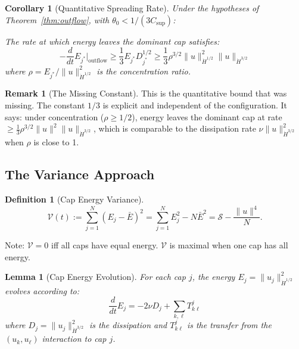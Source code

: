\documentclass[11pt]{article}
\newtheorem{lemma}[theorem]{Lemma}
\newtheorem{corollary}[theorem]{Corollary}
\theoremstyle{definition}
\newtheorem{definition}[theorem]{Definition}
\newtheorem{remark}[theorem]{Remark}
\begin{document}
\begin{corollary}[Quantitative Spreading Rate]\label{cor:spreading-rate}
Under the hypotheses of Theorem~\ref{thm:outflow}, with $\theta_0 < 1/(3C_{\text{sup}})$:

The rate at which energy leaves the dominant cap satisfies:
\begin{equation}\label{eq:spreading-rate}
\boxed{-\frac{d}{dt}E_{j^*}\Big|_{\text{outflow}} \geq \frac{1}{3} E_{j^*} D_{j^*}^{1/2} \geq \frac{1}{3} \rho^{3/2} \|u\|_{\dot{H}^{1/2}}^2 \|u\|_{\dot{H}^{3/2}}}
\end{equation}
where $\rho = E_{j^*}/\|u\|_{\dot{H}^{1/2}}^2$ is the concentration ratio.
\end{corollary}

\begin{remark}[The Missing Constant]
This is the quantitative bound that was missing. The constant $1/3$ is explicit and independent of the configuration. It says: under concentration ($\rho \geq 1/2$), energy leaves the dominant cap at rate $\geq \frac{1}{3}\rho^{3/2}\|u\|^2\|u\|_{\dot{H}^{3/2}}$, which is comparable to the dissipation rate $\nu\|u\|_{\dot{H}^{3/2}}^2$ when $\rho$ is close to 1.
\end{remark}

\subsection{The Variance Approach}

\begin{definition}[Cap Energy Variance]
\begin{equation}
\mathcal{V}(t) := \sum_{j=1}^N (E_j - \bar{E})^2 = \sum_{j=1}^N E_j^2 - N\bar{E}^2 = \mathcal{S} - \frac{\|u\|^4}{N}.
\end{equation}
\end{definition}

Note: $\mathcal{V} = 0$ iff all caps have equal energy. $\mathcal{V}$ is maximal when one cap has all energy.

\begin{lemma}[Cap Energy Evolution]\label{lem:cap-evol}
For each cap $j$, the energy $E_j = \|u_j\|_{\dot{H}^{1/2}}^2$ evolves according to:
\begin{equation}
\frac{d}{dt}E_j = -2\nu D_j + \sum_{k,\ell} T_{k\ell}^j
\end{equation}
where $D_j = \|u_j\|_{\dot{H}^{3/2}}^2$ is the dissipation and $T_{k\ell}^j$ is the transfer from the $(u_k, u_\ell)$ interaction to cap $j$.
\end{lemma}
\end{document}
